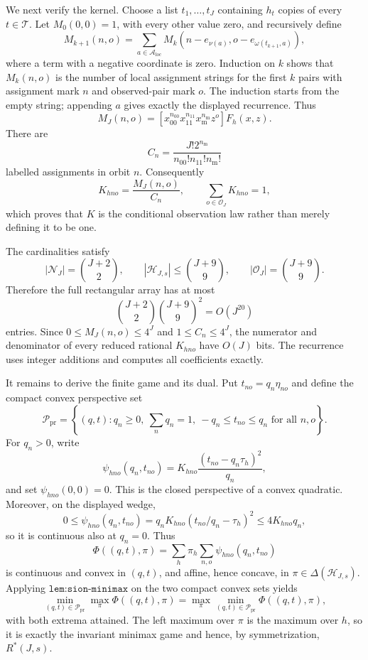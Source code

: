 We next verify the kernel. Choose a list \(t_1,\ldots,t_J\) containing \(h_t\) copies of every \(t\in\mathcal T\). Let \(M_0(0,0)=1\), with every other value zero, and recursively define
\[
 M_{k+1}(n,o)=\sum_{a\in\mathcal A_{\mathrm{loc}}}
 M_k\!\left(n-e_{\nu(a)},o-e_{\omega(t_{k+1},a)}\right),
\]
where a term with a negative coordinate is zero. Induction on \(k\) shows that \(M_k(n,o)\) is the number of local assignment strings for the first \(k\) pairs with assignment mark \(n\) and observed-pair mark \(o\). The induction starts from the empty string; appending \(a\) gives exactly the displayed recurrence. Thus
\[
 M_J(n,o)=
 [x_{00}^{n_{00}}x_{11}^{n_{11}}x_{\mathrm m}^{n_{\mathrm m}}z^o]F_h(x,z).
\]
There are
\[
 C_n=\frac{J!2^{n_{\mathrm m}}}{n_{00}!n_{11}!n_{\mathrm m}!}
\]
labelled assignments in orbit \(n\). Consequently
\[
 K_{hno}=\frac{M_J(n,o)}{C_n},
 \qquad
 \sum_{o\in\mathcal O_J}K_{hno}=1,
\]
which proves that \(K\) is the conditional observation law rather than merely defining it to be one.

The cardinalities satisfy
\[
 |\mathcal N_J|={J+2\choose2},\qquad
 |\mathcal H_{J,s}|\le {J+9\choose9},\qquad
 |\mathcal O_J|={J+9\choose9}.
\]
Therefore the full rectangular array has at most
\[
 {J+2\choose2}{J+9\choose9}^{\!2}=O(J^{20})
\]
entries. Since \(0\le M_J(n,o)\le4^J\) and \(1\le C_n\le4^J\), the numerator and denominator of every reduced rational \(K_{hno}\) have \(O(J)\) bits. The recurrence uses integer additions and computes all coefficients exactly.

It remains to derive the finite game and its dual. Put \(t_{no}=q_n\eta_{no}\) and define the compact convex perspective set
\[
 \mathcal P_{\mathrm{pr}}=
 \left\{(q,t):q_n\ge0,\ \sum_nq_n=1,\ -q_n\le t_{no}\le q_n
 \text{ for all }n,o\right\}.
\]
For \(q_n>0\), write
\[
 \psi_{hno}(q_n,t_{no})
 =K_{hno}\frac{(t_{no}-q_n\tau_h)^2}{q_n},
\]
and set \(\psi_{hno}(0,0)=0\). This is the closed perspective of a convex quadratic. Moreover, on the displayed wedge,
\[
 0\le \psi_{hno}(q_n,t_{no})
 =q_nK_{hno}(t_{no}/q_n-\tau_h)^2
 \le4K_{hno}q_n,
\]
so it is continuous also at \(q_n=0\). Thus
\[
 \Phi((q,t),\pi)=\sum_h\pi_h\sum_{n,o}\psi_{hno}(q_n,t_{no})
\]
is continuous and convex in \((q,t)\), and affine, hence concave, in \(\pi\in\Delta(\mathcal H_{J,s})\). Applying \(\texttt{lem:sion-minimax}\) on the two compact convex sets yields
\[
 \min_{(q,t)\in\mathcal P_{\mathrm{pr}}}\max_{\pi}\Phi((q,t),\pi)
 =\max_{\pi}\min_{(q,t)\in\mathcal P_{\mathrm{pr}}}\Phi((q,t),\pi),
\]
with both extrema attained. The left maximum over \(\pi\) is the maximum over \(h\), so it is exactly the invariant minimax game and hence, by symmetrization, \(R^*(J,s)\).

